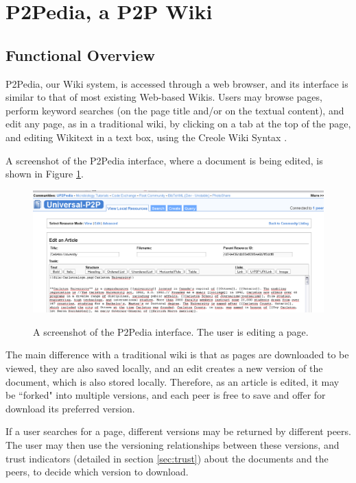 \section{P2Pedia, a P2P Wiki}
\label{sec:proposal}
\subsection{Functional Overview}
P2Pedia, our Wiki system, is accessed through a web browser, and its interface is similar to that of most existing Web-based Wikis. Users may browse pages, perform keyword searches (on the page title and/or on the textual content), and edit any page, as in a traditional wiki, by clicking on a tab at the top of the page, and editing Wikitext in a text box, using the Creole Wiki Syntax \cite{creole1.0spec}. 

A screenshot of the P2Pedia interface, where a document is being edited, is shown in Figure \ref{fig:screenshot}.

\begin{figure}[tb]
\centering
\includegraphics[scale=0.4]{screenshot.png}
\label{fig:screenshot}
\caption{A screenshot of the P2Pedia interface. The user is editing a page.}
\end{figure}


The main difference with a traditional wiki is that as pages are downloaded to be viewed, they are also saved locally, and an edit creates a new version of the document, which is also stored locally. Therefore, as an article is edited, it may be ``forked" into multiple versions, and each peer is free to save and offer for download its preferred version. 

If a user searches for a page, different versions may be returned by different peers. The user may then use the versioning relationships between these versions, and trust indicators (detailed in section \ref{sec:trust}) about the documents and the peers, to decide which version to download. 

